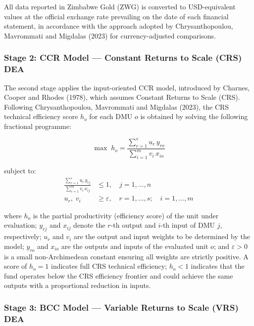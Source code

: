 \documentclass[12pt,a4paper]{article}
\begin{document}
All data reported in Zimbabwe Gold (ZWG) is converted to USD-equivalent values at the official exchange rate prevailing on the date of each financial statement, in accordance with the approach adopted by Chrysanthopoulou, Mavrommati and Migdalas (2023) for currency-adjusted comparisons.

\subsubsection{Stage 2: CCR Model --- Constant Returns to Scale (CRS) DEA}

The second stage applies the input-oriented CCR model, introduced by Charnes, Cooper and Rhodes (1978), which assumes Constant Returns to Scale (CRS). Following Chrysanthopoulou, Mavrommati and Migdalas (2023), the CRS technical efficiency score $h_o$ for each DMU $o$ is obtained by solving the following fractional programme:

\begin{equation}
\max \; h_o = \frac{\displaystyle\sum_{r=1}^{s} u_r \, y_{ro}}{\displaystyle\sum_{i=1}^{m} v_i \, x_{io}}
\end{equation}

subject to:
\begin{align}
\frac{\displaystyle\sum_{r=1}^{s} u_r \, y_{rj}}{\displaystyle\sum_{i=1}^{m} v_i \, x_{ij}} &\leq 1, \quad j = 1, \ldots, n \\[6pt]
u_r,\; v_i &\geq \varepsilon, \quad r = 1, \ldots, s; \quad i = 1, \ldots, m
\end{align}

where $h_o$ is the partial productivity (efficiency score) of the unit under evaluation; $y_{rj}$ and $x_{ij}$ denote the $r$-th output and $i$-th input of DMU $j$, respectively; $u_r$ and $v_i$ are the output and input weights to be determined by the model; $y_{ro}$ and $x_{io}$ are the outputs and inputs of the evaluated unit $o$; and $\varepsilon > 0$ is a small non-Archimedean constant ensuring all weights are strictly positive. A score of $h_o = 1$ indicates full CRS technical efficiency; $h_o < 1$ indicates that the fund operates below the CRS efficiency frontier and could achieve the same outputs with a proportional reduction in inputs.

\subsubsection{Stage 3: BCC Model --- Variable Returns to Scale (VRS) DEA}
\end{document}
